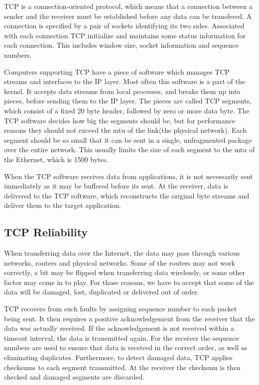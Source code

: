  TCP is a connection-oriented protocol, which means that a connection between a
 sender and the receiver must be established before any data can be transfered.
 A connection is specified by a pair of sockets identifying its two sides.
 Associated with each connection TCP initialize and maintains some status
 information for each connection. This includes window size, socket information
 and sequence numbers.

Computers supporting TCP have a piece of software which manages TCP streams and
interfaces to the IP layer. Most often this software is a part of the
kernel\cite{computer-networks}. It accepts data streams from local processes,
and breaks them up into pieces, before sending them to the IP layer. The pieces
are called TCP segments, which consist of a fixed 20 byte header, followed by
zero or more data byte. The TCP software decides how big the segments should be,
but for performance reasons they should not exceed the \gls{mtu} of the link(the
physical network). Each segment should be so small that it can be sent in a
single, unfragmented package over the entire network. This usually limits the
size of each segment to the \gls{mtu} of the Ethernet, which is 1500 bytes.

When the TCP software receives data from applications, it is not necessarily
sent immediately as it may be buffered before its sent. At the receiver, data is
delivered to the TCP software, which reconstructs the original byte streams and
deliver them to the target application.


\subsection{TCP Reliability}

When transferring data over the Internet, the data may pass through various
networks, routers and physical networks. Some of the routers may not work
correctly, a bit may be flipped when transferring data wirelessly, or some other
factor may come in to play. For those reasons, we have to accept that some of
the data will be damaged, lost, duplicated or delivered out of order.

TCP recovers from such faults by assigning sequence number to each packet being
sent. It then requires a positive acknowledgement from the receiver that the
data was actually received. If the acknowledgement is not received within a
timeout interval, the data is transmitted again. For the receiver the sequence
numbers are used to ensure that data is received in the correct order, as well
as eliminating duplicates. Furthermore, to detect damaged data, TCP applies
checksums to each segment transmitted. At the receiver the checksum is then
checked and damaged segments are discarded.

